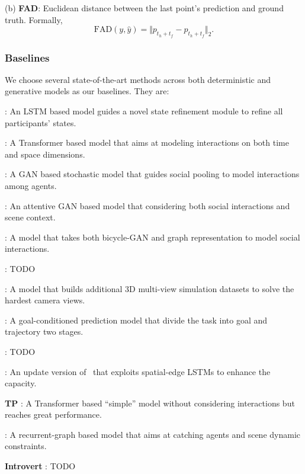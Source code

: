 \documentclass[../paper.tex]{subfiles}
\begin{document}
(b) \textbf{FAD}:
Euclidean distance between the last point's prediction and ground truth.
Formally,
\begin{equation}
    \mbox{FAD}(y, \hat{y}) = \Vert p_{t_h + t_f} - \hat{p}_{t_h + t_f} \Vert_2.
\end{equation}

\subsubsection{Baselines}
We choose several state-of-the-art methods across both deterministic and generative models as our baselines.
They are:

\textbf{\SRLSTM} \cite{srLSTM}:
An LSTM based model guides a novel state refinement module to refine all participants' states.

\textbf{\TRANSFORMER} \cite{yu2020spatio}:
A Transformer based model that aims at modeling interactions on both time and space dimensions.

\textbf{\SOCIALGAN} \cite{socialGAN}:
A GAN based stochastic model that guides social pooling to model interactions among agents.

\textbf{\SOPHIE} \cite{sophie}:
An attentive GAN based model that considering both social interactions and scene context.

\textbf{\BIGAT} \cite{bigat}:
A model that takes both bicycle-GAN and graph representation to model social interactions.

\textbf{\GARDEN} \cite{Liang_2020_CVPR}:
TODO

\textbf{\SIMAUG} \cite{liang2020simaug}:
A model that builds additional 3D multi-view simulation datasets to solve the hardest camera views.

\textbf{\PECNET} \cite{mangalam2020not}:
A goal-conditioned prediction model that divide the task into goal and trajectory two stages.

\textbf{\TPNMS} \cite{liang2020temporal}:
TODO

\textbf{\SRPAMI} \cite{zhang2020social}:
An update version of \SRLSTM~that exploits spatial-edge LSTMs to enhance the capacity.

\textbf{TP} \cite{giuliari2020transformer}:
A Transformer based ``simple'' model without considering interactions but reaches great performance.

\textbf{\TRAJECTRONPP} \cite{salzmann2020trajectron}:
A recurrent-graph based model that aims at catching agents and scene dynamic constraints.

\textbf{Introvert} \cite{shafiee2021introvert}:
TODO
\end{document}
